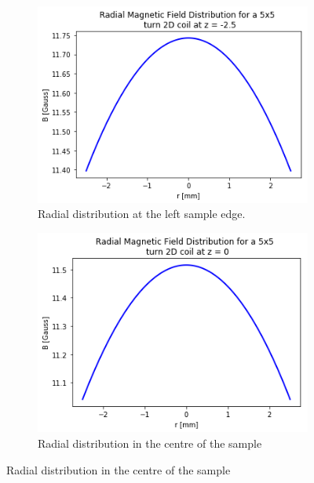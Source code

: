 \documentclass[%
 reprint,
 amsmath,
 amssymb,
 aps,
]{revtex4-1}
\begin{document}
   \begin{figure}
            \centering
            \begin{subfigure}[b]{0.3\textwidth}
                \centering
                \includegraphics[width=\textwidth]{radneg25.png}
                \caption{Radial distribution at the left sample edge.}
                \label{fig:y equals x}
            \end{subfigure}
            \hfill
            \begin{subfigure}[b]{0.3\textwidth}
                \centering
                \includegraphics[width=\textwidth]{rad0.png}
                \caption{Radial distribution in the centre of the sample}
                \label{fig:three sin x}
            \end{subfigure}

\end{figure}
\end{document}
